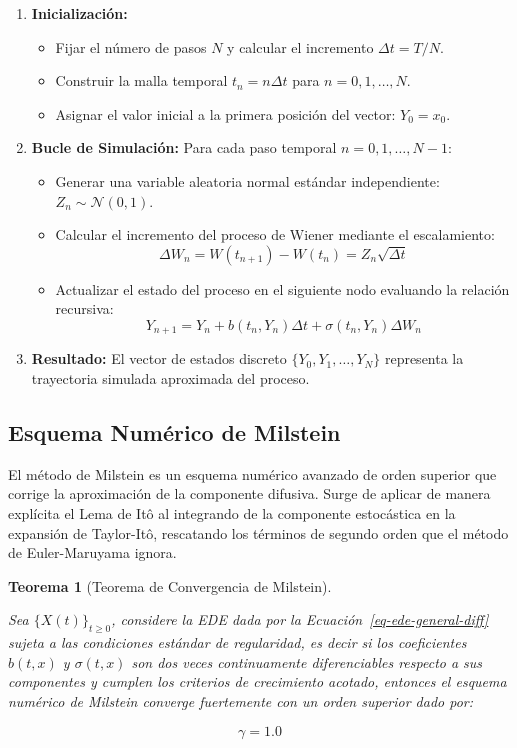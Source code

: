 \documentclass[
  spanish,
  letterpaper,
  DIV=11,
  numbers=noendperiod]{scrreprt}
\providecommand{\tightlist}{%
  \setlength{\itemsep}{0pt}\setlength{\parskip}{0pt}}
\theoremstyle{plain}
\newtheorem{theorem}{Teorema}[chapter]
\theoremstyle{definition}
\theoremstyle{remark}
\begin{document}
\begin{enumerate}
\def\labelenumi{\arabic{enumi}.}
\tightlist
\item
  \textbf{Inicialización:}

  \begin{itemize}
  \tightlist
  \item
    Fijar el número de pasos \(N\) y calcular el incremento
    \(\Delta t = T/N\).
  \item
    Construir la malla temporal \(t_n = n \Delta t\) para
    \(n = 0, 1, \dots, N\).
  \item
    Asignar el valor inicial a la primera posición del vector:
    \(Y_0 = x_0\).
  \end{itemize}
\item
  \textbf{Bucle de Simulación:} Para cada paso temporal
  \(n = 0, 1, \dots, N-1\):

  \begin{itemize}
  \tightlist
  \item
    Generar una variable aleatoria normal estándar independiente:
    \(Z_n \sim \mathcal{N}(0, 1)\).
  \item
    Calcular el incremento del proceso de Wiener mediante el
    escalamiento:
    \[\Delta W_n = W(t_{n+1}) - W(t_n) = Z_n \sqrt{\Delta t}\]
  \item
    Actualizar el estado del proceso en el siguiente nodo evaluando la
    relación recursiva:
    \[Y_{n+1} = Y_n + b(t_n, Y_n) \Delta t + \sigma(t_n, Y_n) \Delta W_n\]
  \end{itemize}
\item
  \textbf{Resultado:} El vector de estados discreto
  \(\{Y_0, Y_1, \dots, Y_N\}\) representa la trayectoria simulada
  aproximada del proceso.
\end{enumerate}

\subsection{Esquema Numérico de
Milstein}\label{esquema-numuxe9rico-de-milstein}

El método de Milstein es un esquema numérico avanzado de orden superior
que corrige la aproximación de la componente difusiva. Surge de aplicar
de manera explícita el Lema de Itô al integrando de la componente
estocástica en la expansión de Taylor-Itô, rescatando los términos de
segundo orden que el método de Euler-Maruyama ignora.

\begin{theorem}[Teorema de Convergencia de
Milstein]\protect\hypertarget{thm-milstein}{}\label{thm-milstein}

Sea \(\{X(t)\}_{t \ge 0}\), considere la EDE dada por la
Ecuación~\ref{eq-ede-general-diff} sujeta a las condiciones estándar de
regularidad, es decir si los coeficientes \(b(t, x)\) y \(\sigma(t, x)\)
son dos veces continuamente diferenciables respecto a sus componentes y
cumplen los criterios de crecimiento acotado, entonces el esquema
numérico de Milstein converge fuertemente con un orden superior dado
por:

\[
\gamma = 1.0
\]

\end{theorem}
\end{document}

